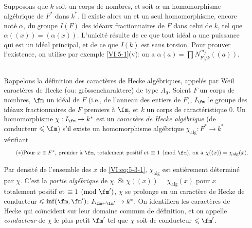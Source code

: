 \subsection{}\label{VI:5-2}

Supposons que $k$ soit un corps de nombres, et soit $\alpha$ un homomorphisme 
algébrique de $F^\ast$ dans $k^\ast$. Il existe alors un et un seul 
homomorphisme, encore noté $\alpha$, du groupe $I(F)$ des idéaux 
fractionnaires de $F$ dans celui de $k$, tel que $\alpha((x))=(\alpha(x))$. 
L'unicité résulte de ce que tout idéal a une puissance qui est un 
idéal principal, et de ce que $I(k)$ est sans torsion. Pour prouver 
l'existence, on utilise par exemple \ref{VI:5-1}(v): on a 
$\alpha(a) = \prod N_{F_j/k}^{m_j}((a))$. 





\subsection{}\label{VI:5-3}

Rappelons la définition des caractères de Hecke algébriques, appelés 
par Weil caractères de Hecke (ou: gr\"ossencharaktere) de type $A_0$. Soient $F$ 
un corps de nombres, $\fm$ un idéal de $F$ (i.e., de l'anneau des entiers de 
$F$), $I_\fm$ le groupe des idéaux fractionnaires de $F$ premiers à $\fm$, 
et $k$ un corps de caractéristique $0$. Un homomorphisme 
$\chi:I_\fm \to k^\ast$ est un \emph{caractère de Hecke algébrique} (de 
conducteur $\leqslant \fm$) s'il existe un homomorphisme algébrique 
$\chi_\text{alg}:F^\ast \to k^\ast$ vérifiant 
\begin{equation*}\tag{$*$}\label{VI:eq:5-3-1}
\text{Pour $x\in F^\ast$, premier à $\fm$, totalement positif et 
$\equiv 1\pmod\fm$, on a $\chi((x))=\chi_\text{alg}(x)$.}
\end{equation*}

Par densité de l'ensemble des $x$ de \eqref{VI:eq:5-3-1}, $\chi_\text{alg}$ 
est entièrement déterminé par $\chi$. C'est la \emph{partie algébrique} 
de $\chi$. Si $\chi((x))=\chi_\text{alg}(x)$ pour $x$ totalement positif et 
$\equiv 1\pmod{\fm'}$, $\chi$ se prolonge en un caractère de Hecke de 
conducteur $\leqslant \inf(\fm,\fm')$: $I_{\fm+\fm'}\to k^\ast$. On 
identifiera les caractères de Hecke qui coïncident sur leur domaine commun de 
définition, et on appelle \emph{conducteur} de $\chi$ le plus petit $\fm'$ 
tel que $\chi$ soit de conducteur $\leqslant \fm'$. 





